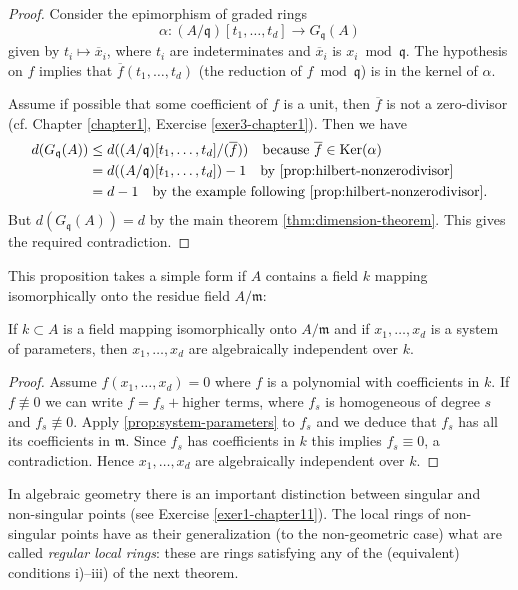 \begin{proof}
Consider the epimorphism of graded rings
\[
    \alpha \colon (A/\mathfrak{q})[t_1, \ldots, t_d] \to G_{\mathfrak{q}}(A)
\]
given by $t_i \mapsto \overline{x}_i$, where $t_i$ are indeterminates and $\overline{x}_i$ is $x_i \bmod \mathfrak{q}$. The hypothesis on $f$ implies that $\overline{f}(t_1, \ldots, t_d)$ (the reduction of $f \bmod \mathfrak{q}$) is in the kernel of $\alpha$.

Assume if possible that some coefficient of $f$ is a unit, then $\overline{f}$ is not a zero-divisor (cf. Chapter \ref{chapter1}, Exercise \ref{exer3-chapter1}). Then we have
\begin{align*}
    d(G_{\mathfrak{q}}(A)) &\leq d((A/\mathfrak{q})[t_1, \ldots, t_d]/(\overline{f})) \quad \text{because } \overline{f} \in \operatorname{Ker}(\alpha) \\
    &= d((A/\mathfrak{q})[t_1, \ldots, t_d]) - 1 \quad \text{by \eqref{prop:hilbert-nonzerodivisor}} \\
    &= d - 1 \quad \text{by the example following \eqref{prop:hilbert-nonzerodivisor}.}
\end{align*}
But $d(G_{\mathfrak{q}}(A)) = d$ by the main theorem \eqref{thm:dimension-theorem}. This gives the required contradiction.
\end{proof}

This proposition takes a simple form if $A$ contains a field $k$ mapping isomorphically onto the residue field $A/\mathfrak{m}$:

\begin{corollary}\label{cor:algebraic-independence}
If $k \subset A$ is a field mapping isomorphically onto $A/\mathfrak{m}$ and if $x_1, \ldots, x_d$ is a system of parameters, then $x_1, \ldots, x_d$ are algebraically independent over $k$.
\end{corollary}

\begin{proof}
Assume $f(x_1, \ldots, x_d) = 0$ where $f$ is a polynomial with coefficients in $k$. If $f \not\equiv 0$ we can write $f = f_s + \text{higher terms}$, where $f_s$ is homogeneous of degree $s$ and $f_s \not\equiv 0$. Apply \eqref{prop:system-parameters} to $f_s$ and we deduce that $f_s$ has all its coefficients in $\mathfrak{m}$. Since $f_s$ has coefficients in $k$ this implies $f_s \equiv 0$, a contradiction. Hence $x_1, \ldots, x_d$ are algebraically independent over $k$.
\end{proof}

In algebraic geometry there is an important distinction between singular and non-singular points (see Exercise \ref{exer1-chapter11}). The local rings of non-singular points have as their generalization (to the non-geometric case) what are called \emph{regular local rings}: these are rings satisfying any of the (equivalent) conditions i)--iii) of the next theorem.


